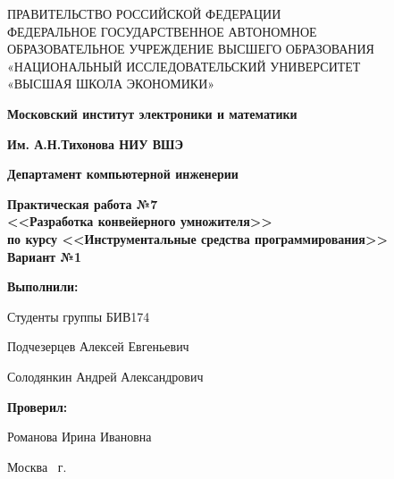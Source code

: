 \begin{titlepage}
	\begin{center}
		ПРАВИТЕЛЬСТВО РОССИЙСКОЙ ФЕДЕРАЦИИ \\
 		ФЕДЕРАЛЬНОЕ  ГОСУДАРСТВЕННОЕ АВТОНОМНОЕ \\
		ОБРАЗОВАТЕЛЬНОЕ УЧРЕЖДЕНИЕ ВЫСШЕГО ОБРАЗОВАНИЯ\\
		«НАЦИОНАЛЬНЫЙ ИССЛЕДОВАТЕЛЬСКИЙ УНИВЕРСИТЕТ\\
		«ВЫСШАЯ ШКОЛА ЭКОНОМИКИ»
	\end{center}
	
	\begin{center}
		\textbf{Московский институт электроники и математики}
		
		\textbf{Им. А.Н.Тихонова НИУ ВШЭ}
		
		\vspace{2ex}
		
		\textbf{Департамент компьютерной инженерии}
	\end{center}
	\vspace{1ex}	
	
	\vspace{1ex}
	\begin{center}
		\textbf{Практическая работа №7 \\
			<<Разработка конвейерного умножителя>> \\
			по курсу <<Инструментальные средства программирования>>\\
			Вариант №1
	}
	\end{center}	

	\vspace{2ex}
	\vfill
	
	\vspace{2ex}
	
	\begin{flushright}
		\textbf{Выполнили:}
		
		\vspace{2ex}
		
		Студенты группы БИВ174
		
		\vspace{2ex}
		
		Подчезерцев Алексей Евгеньевич
		
		Солодянкин Андрей Александрович
		
		\vspace{2ex}
		
		\textbf{Проверил:}
		
		\vspace{2ex}
		
		Романова Ирина Ивановна
	\end{flushright}

	\vspace{5ex}
	\begin{center}
		Москва \the\year \, г.
	\end{center}
	
\end{titlepage}
\addtocounter{page}{1}